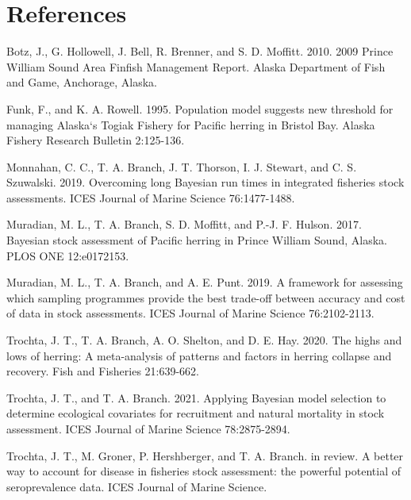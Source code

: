 \documentclass[
  11pt,
]{article}
\begin{document}
\newpage

\hypertarget{references}{%
\section{References}\label{references}}

Botz, J., G. Hollowell, J. Bell, R. Brenner, and S. D. Moffitt. 2010.
2009 Prince William Sound Area Finfish Management Report. Alaska
Department of Fish and Game, Anchorage, Alaska.

Funk, F., and K. A. Rowell. 1995. Population model suggests new
threshold for managing Alaska`s Togiak Fishery for Pacific herring in
Bristol Bay. Alaska Fishery Research Bulletin 2:125-136.

Monnahan, C. C., T. A. Branch, J. T. Thorson, I. J. Stewart, and C. S.
Szuwalski. 2019. Overcoming long Bayesian run times in integrated
fisheries stock assessments. ICES Journal of Marine Science
76:1477-1488.

Muradian, M. L., T. A. Branch, S. D. Moffitt, and P.-J. F. Hulson. 2017.
Bayesian stock assessment of Pacific herring in Prince William Sound,
Alaska. PLOS ONE 12:e0172153.

Muradian, M. L., T. A. Branch, and A. E. Punt. 2019. A framework for
assessing which sampling programmes provide the best trade-off between
accuracy and cost of data in stock assessments. ICES Journal of Marine
Science 76:2102-2113.

Trochta, J. T., T. A. Branch, A. O. Shelton, and D. E. Hay. 2020. The
highs and lows of herring: A meta-analysis of patterns and factors in
herring collapse and recovery. Fish and Fisheries 21:639-662.

Trochta, J. T., and T. A. Branch. 2021. Applying Bayesian model
selection to determine ecological covariates for recruitment and natural
mortality in stock assessment. ICES Journal of Marine Science
78:2875-2894.

Trochta, J. T., M. Groner, P. Hershberger, and T. A. Branch. in review.
A better way to account for disease in fisheries stock assessment: the
powerful potential of seroprevalence data. ICES Journal of Marine
Science.
\end{document}

